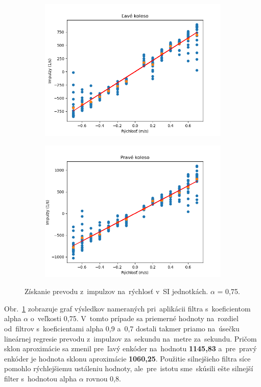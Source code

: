 \begin{figure}[!htbp]
	\begin{subfigure}{0.5\textwidth}
		\includegraphics[width=\textwidth]{img/lw_075250.png}
	\end{subfigure}
	\hfill
	\begin{subfigure}{0.5\textwidth}
		\includegraphics[width=\textwidth]{img/rw_075250.png}
	\end{subfigure}
	\caption{Získanie prevodu z~impulzov na~rýchlosť v~SI jednotkách. \(\alpha\) = 0,75.}
	\label{fig:rw_lw_075250}
\end{figure}

Obr.~\ref{fig:rw_lw_075250} zobrazuje graf výsledkov nameraných pri~aplikácii filtra s~koeficientom alpha $\alpha$ o~veľkosti
0,75. V~tomto prípade sa priemerné hodnoty na~rozdiel od~filtrov s~koeficientami alpha 0,9 a~0,7 dostali takmer priamo na~úsečku
lineárnej regresie prevodu z~impulzov za~sekundu na~metre za~sekundu. Pričom sklon aproximácie sa zmenil pre~ľavý
enkóder na~hodnotu \textbf{1145,83} a~pre~pravý enkóder je hodnota sklonu aproximácie \textbf{1060,25}. Použitie silnejšieho filtra
síce pomohlo rýchlejšiemu ustáleniu hodnoty, ale~pre~istotu sme~skúsili ešte silnejší filter s~hodnotou alpha $\alpha$ rovnou 0,8.


